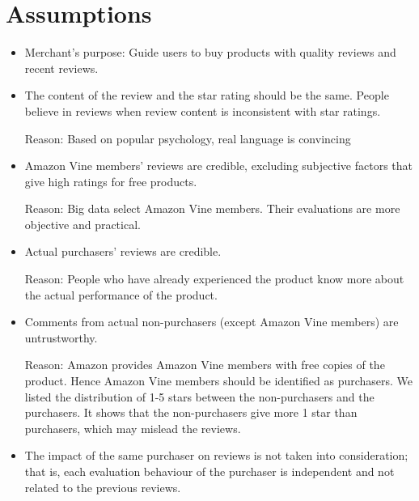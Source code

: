 \documentclass{mcmthesis}
\begin{document}
\section{ Assumptions }
\begin{itemize}
  \item Merchant's purpose: Guide users to buy products with quality reviews and recent reviews.
\end{itemize}
\begin{itemize}
  \item The content of the review and the star rating should be the same. People believe in reviews when review content is inconsistent with star ratings.

Reason: Based on popular psychology, real language is convincing 
\end{itemize}
\begin{itemize}
  \item Amazon Vine members' reviews are credible, excluding subjective factors that give high ratings for free products.

Reason: Big data select Amazon Vine members. Their evaluations are more objective and practical.
\end{itemize}
\begin{itemize}
  \item Actual purchasers' reviews are credible.

Reason: People who have already experienced the product know more about the actual performance of the product.
\end{itemize}
\begin{itemize}
  \item Comments from actual non-purchasers (except Amazon Vine members) are untrustworthy.

Reason: Amazon provides Amazon Vine members with free copies of the product. Hence Amazon Vine members should be identified as purchasers. We listed the distribution of 1-5 stars between the non-purchasers and the purchasers. It shows that the non-purchasers give more 1 star than purchasers, which may mislead the reviews.
\end{itemize}
\begin{itemize}
  \item The impact of the same purchaser on reviews is not taken into consideration; that is, each evaluation behaviour of the purchaser is independent and not related to the previous reviews.
\end{itemize}
\end{document}
